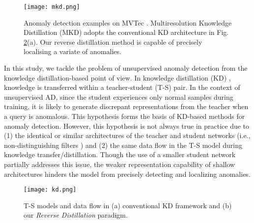 \documentclass[10pt,twocolumn,letterpaper]{article}
\begin{document}
\begin{figure}[t]
  \centering
   \texttt{[image: mkd.png]}
   \caption{Anomaly detection examples on MVTec \cite{mvtec}. Multiresolution Knowledge Distillation (MKD) \cite{mkd} adopts the conventional KD architecture in Fig. \cref{fig:kd}(a). Our reverse distillation method is capable of precisely localising a variate of anomalies.} \label{fig:mkd}
\end{figure}

In this study, we tackle the problem of unsupervised anomaly detection from the knowledge distillation-based point of view. In knowledge distillation (KD) \cite{kd,kdr}, knowledge is transferred within a teacher-student (T-S) pair. In the context of unsupervised AD, since the student experiences only normal samples during training, it is likely to generate discrepant representations from the teacher when a query is anomalous. This hypothesis forms the basis of KD-based methods for anomaly detection. However, this hypothesis is not always true in practice due to (1) the identical or similar architectures of the teacher and student networks (i.e., non-distinguishing filters \cite{mkd}) and (2) the same data flow in the T-S model during knowledge transfer/distillation. Though the use of a smaller student network partially addresses this issue\cite{mkd,stpm}, the weaker representation capability of shallow architectures hinders the model from precisely detecting and localizing anomalies.

\begin{figure}[t]
  \centering
   \texttt{[image: kd.png]}
   \caption{T-S models and data flow in (a) conventional KD framework \cite{kdr,mkd} and (b) our \emph{Reverse Distillation} paradigm.} \label{fig:kd}
\end{figure}
\end{document}

